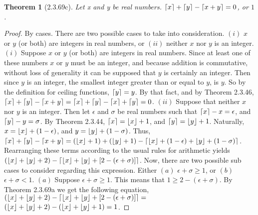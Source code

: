 \documentclass[a4paper, 12pt]{article}
\theoremstyle{plain}
\newtheorem*{theorem*}{Theorem}
\DeclarePairedDelimiter{\floor}{\lfloor}{\rfloor}
\DeclarePairedDelimiter{\ceil}{\lceil}{\rceil}
\begin{document}
	\begin{theorem*}[2.3.69c]
		Let x and y be real numbers. \newline $\ceil{x} + \ceil{y} - \ceil{x + y} = 0$, or $1$.		
	\end{theorem*}
	
	\begin{proof}
		By cases. There are two possible cases to take into consideration. \newline $(i)$ $x$ or $y$ (or both) are integers in real numbers, or $(ii)$ neither $x$ nor $y$ is an integer.
		\newline
		\newline
		$(i)$ Suppose $x$ or $y$ (or both) are integers in real numbers. Since at least one of these numbers $x$ or $y$ must be an integer, and because addition is commutative, without loss of generality it can be supposed that $y$ is certainly an integer.	Then since $y$ is an integer, the smallest integer greater than or equal to $y$, is $y$. So by the definition for ceiling functions, $\ceil{y} = y$. By that fact, and by Theorem 2.3.46, $\ceil{x} + \ceil{y} - \ceil{x + y} = \ceil{x} + \ceil{y} - \ceil{x} + \ceil{y} = 0$.
		\newline
		\newline
		$(ii)$ Suppose that neither $x$ nor $y$ is an integer. Then let $\epsilon$ and $\sigma$ be real numbers such that $\ceil{x} - x = \epsilon$, and $\ceil{y} - y = \sigma$. By Theorem 2.3.44, $\ceil{x} = \floor{x} + 1$, and $\ceil{y} = \floor{y} + 1$. Naturally, $x = \floor{x} + (1 - \epsilon)$, and $y = \floor{y} + (1 - \sigma)$. Thus, $\ceil{x} + \ceil{y} - \ceil{x + y} =  (\floor{x}+1) + (\floor{y}+1) - \ceil{\floor{x} + (1 - \epsilon) + \floor{y} + (1 - \sigma)}$. Rearranging these terms according to the usual rules for arithmetic yields $(\floor{x} + \floor{y} + 2) - \ceil{\floor{x} + \floor{y} + [2 - (\epsilon + \sigma)]}$. Now, there are two possible sub cases to consider regarding this expression. Either $(a)$ $\epsilon + \sigma \ge 1$, or $(b)$ $\epsilon + \sigma < 1$.
		\newline
		\newline
		\indent $(a)$ Suppose 
		$\epsilon + \sigma \ge 1$. This means that $1 \ge 2 - (\epsilon + \sigma)$. By  \newline \indent Theorem 2.3.69a we get the following equation, \newline \indent $(\floor{x} + \floor{y} + 2) - \ceil{\floor{x} + \floor{y} + [2 - (\epsilon + \sigma)]} =$ \newline \indent $(\floor{x} + \floor{y} + 2) - (\floor{x} + \floor{y} + 1) = 1$.

\end{proof}
\end{document}
